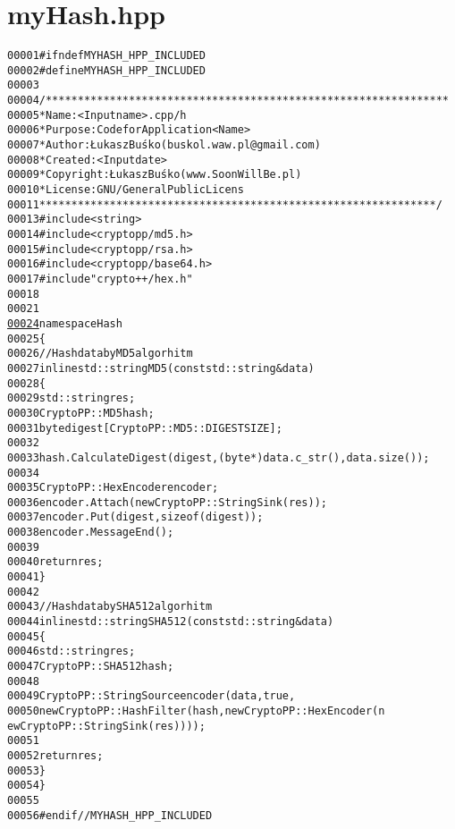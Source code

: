 \hypertarget{myHash_8hpp_source}{
\section{myHash.hpp}
}


\begin{footnotesize}\begin{alltt}
00001 \textcolor{preprocessor}{#ifndef MYHASH\_HPP\_INCLUDED}
00002 \textcolor{preprocessor}{}\textcolor{preprocessor}{#define MYHASH\_HPP\_INCLUDED}
00003 \textcolor{preprocessor}{}
00004 \textcolor{comment}{/***************************************************************}
00005 \textcolor{comment}{ * Name:      <Input name>.cpp/h}
00006 \textcolor{comment}{ * Purpose:   Code for Application <Name>}
00007 \textcolor{comment}{ * Author:    Łukasz Buśko (buskol.waw.pl@gmail.com)}
00008 \textcolor{comment}{ * Created:   <Input date>}
00009 \textcolor{comment}{ * Copyright: Łukasz Buśko (www.SoonWillBe.pl)}
00010 \textcolor{comment}{ * License:   GNU / General Public Licens}
00011 \textcolor{comment}{ **************************************************************/}
00013 \textcolor{preprocessor}{#include <string>}
00014 \textcolor{preprocessor}{#include <cryptopp/md5.h>}
00015 \textcolor{preprocessor}{#include <cryptopp/rsa.h>}
00016 \textcolor{preprocessor}{#include <cryptopp/base64.h>}
00017 \textcolor{preprocessor}{#include "crypto++/hex.h"}
00018 
00021 
\hypertarget{myHash_8hpp_source_l00024}{}\hyperlink{namespaceHash}{00024} \textcolor{keyword}{namespace }Hash
00025 \{
00026         \textcolor{comment}{//Hash data by MD5 algorhitm}
00027         \textcolor{keyword}{inline} std::string MD5(\textcolor{keyword}{const} std::string& data)
00028         \{
00029                 std::string res;
00030                 CryptoPP::MD5 hash;
00031                 byte digest[CryptoPP::MD5::DIGESTSIZE];
00032 
00033                 hash.CalculateDigest(digest, (byte*)data.c\_str(), data.size());
00034 
00035                 CryptoPP::HexEncoder encoder;
00036                 encoder.Attach(\textcolor{keyword}{new} CryptoPP::StringSink(res));
00037                 encoder.Put(digest, \textcolor{keyword}{sizeof}(digest));
00038                 encoder.MessageEnd();
00039 
00040                 \textcolor{keywordflow}{return} res;
00041         \}
00042 
00043         \textcolor{comment}{//Hash data by SHA512 algorhitm}
00044         \textcolor{keyword}{inline} std::string SHA512(\textcolor{keyword}{const} std::string& data)
00045         \{
00046                 std::string res;
00047                 CryptoPP::SHA512 hash;
00048 
00049                 CryptoPP::StringSource encoder(data, \textcolor{keyword}{true},
00050                         \textcolor{keyword}{new} CryptoPP::HashFilter(hash, \textcolor{keyword}{new} CryptoPP::HexEncoder(\textcolor{keyword}{n
      ew} CryptoPP::StringSink(res))));
00051 
00052                 \textcolor{keywordflow}{return} res;
00053         \}
00054 \}
00055 
00056 \textcolor{preprocessor}{#endif // MYHASH\_HPP\_INCLUDED}
\end{alltt}\end{footnotesize}
